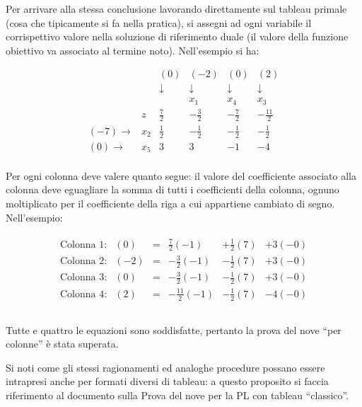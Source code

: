 \documentclass{article}
\begin{document}
	Per arrivare alla stessa conclusione lavorando direttamente sul tableau primale (cosa che tipicamente si fa nella pratica), si assegni ad ogni variabile il corrispettivo valore nella soluzione di riferimento duale (il valore della funzione obiettivo va associato al termine noto). Nell'esempio si ha:
	
  	\[
  	\begin{array}{rrrrrr}
  	& & (0) & (-2)  & (0) & (2) \\
  	&  & \downarrow \;& \downarrow \;& \downarrow \;& \downarrow \;\\
  	& &  & x_1  & x_4 & x_3  \\
  	 & z  & \frac{7}{2} & -\frac{3}{2} & -\frac{7}{2}  & -\frac{11}{2} \\
  	(-7) \rightarrow & x_2 &  \frac{1}{2} &  -\frac{1}{2}  & -\frac{1}{2}  &  -\frac{1}{2} \\
  	(0) \rightarrow &   x_5 &  3 &  3  &  -1  &  -4 \\
  	
  	\end{array}
  	\]	   	
  	
  	Per ogni colonna deve valere quanto segue: il valore del coefficiente associato alla colonna deve eguagliare la somma di tutti i coefficienti della colonna, ognuno moltiplicato per il coefficiente della riga a cui appartiene cambiato di segno. Nell'esempio:  	
  	
  	\[
  	\begin{array}{c}
  	\begin{array}{llcrrr}
  	\text{Colonna 1:} & (0) &=& \frac{7}{2}(-1) & +\frac{1}{2}(7) & +3(-0) \\
  	\text{Colonna 2:} & (-2) &=& -\frac{3}{2}(-1) & -\frac{1}{2}(7) & +3(-0) \\
  	\text{Colonna 3:} & (0) &=& -\frac{3}{2}(-1) & -\frac{1}{2}(7) & +3(-0) \\
  	\text{Colonna 4:} & (2) &=& -\frac{11}{2}(-1) & -\frac{1}{2}(7) & -4(-0) \\
  	\end{array}\\		
  	\end{array}
  	\]  	
  	
  	Tutte e quattro le equazioni sono soddisfatte, pertanto la prova del nove ``per colonne'' è stata superata.
  	
  	Si noti come gli stessi ragionamenti ed analoghe procedure possano essere intrapresi anche per formati diversi di tableau: a questo proposito si faccia riferimento al documento sulla Prova del nove per la PL con tableau ``classico''.
\end{document}

